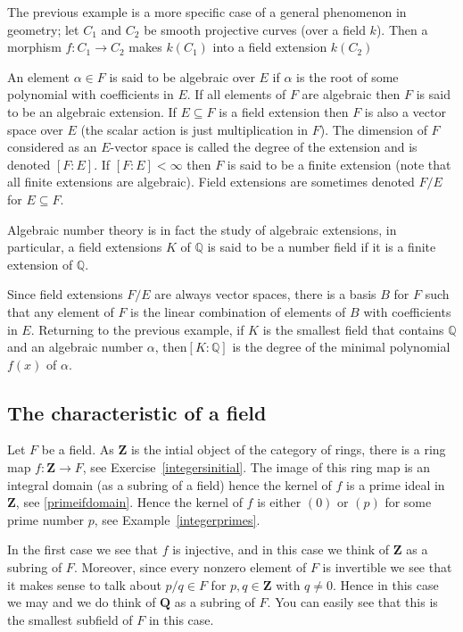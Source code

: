 \begin{example} The previous example is a more specific case of a general
phenomenon in geometry; let $C_1$ and $C_2$ be smooth projective curves (over a
field $k$). Then a morphism $f:C_1\rightarrow C_2$ makes $k(C_1)$ into a field
extension $k(C_2)$ 
\end{example}

\begin{definition}An element $\alpha\in F$ is said to be algebraic over $E$ if
$\alpha$ is the root of some polynomial with coefficients in $E$. If all
elements of $F$ are algebraic then $F$ is said to be an algebraic extension. If
$E\subseteq F$ is a field extension then $F$ is also a vector space over $E$
(the scalar action is just multiplication in $F$). The dimension of $F$
considered as an $E$-vector space is called the degree of the extension and is
denoted $[F:E]$. If $[F:E]<\infty$ then $F$ is said to be a finite extension
(note that all finite extensions are algebraic). Field extensions are sometimes
denoted $F/E$ for $E\subseteq F$.
\end{definition}

Algebraic number theory is in fact the study of algebraic extensions, in
particular, a field extensions $K$ of $\mathbb{Q}$ is said to be a number field
if it is a finite extension of $\mathbb{Q}$.

Since field extensions $F/E$ are always vector spaces, there is a basis $B$ for
$F$ such that any element of $F$ is the linear combination of elements of $B$
with coefficients in $E$. Returning to the previous example, if $K$ is the
smallest field that contains $\mathbb{Q}$ and an algebraic number $\alpha$,
then$[K:\mathbb{Q}]$ is the degree of the minimal polynomial $f(x)$ of $\alpha$.


\subsection{The characteristic of a field}
\label{more-fields}

\noindent
Let $F$ be a field. As $\mathbf{Z}$ is the intial object of the category of
rings, there is a ring map $f : \mathbf{Z} \to F$, see
Exercise~\ref{integersinitial}.
The image of this ring map is an integral domain (as a subring of a field)
hence the kernel of $f$ is a prime ideal in $\mathbf{Z}$, see
\cref{primeifdomain}.
Hence the kernel of $f$ is either $(0)$ or $(p)$ for some prime number $p$, see
Example~\ref{integerprimes}.

In the first case we see that $f$ is injective, and in this case
we think of $\mathbf{Z}$ as a subring of $F$. Moreover, since every
nonzero element of $F$ is invertible we see that it makes sense to
talk about $p/q \in F$ for $p, q \in \mathbf{Z}$ with $q \not = 0$.
Hence in this case we may and we do think of $\mathbf{Q}$ as a subring of $F$.
You can easily see that this is the smallest subfield of $F$ in this case.

